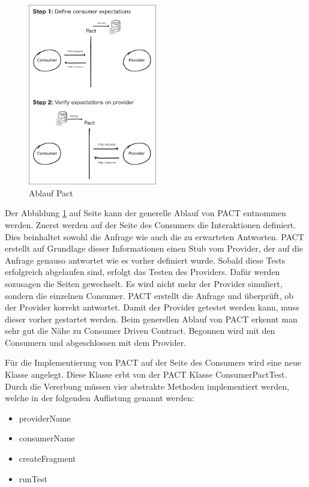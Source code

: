 \documentclass{llncs}
\begin{document}
\begin{figure}[htbp]
  \centering
      \includegraphics[width=0.5\textwidth]{./Images/pact}
    \caption{Ablauf Pact}
    \label{fig:Pact}
\end{figure}

Der Abbildung \ref{fig:Pact} auf Seite \pageref{fig:Pact} kann der generelle Ablauf von PACT entnommen werden. Zuerst werden auf der Seite des Consumers die Interaktionen definiert. Dies beinhaltet sowohl die Anfrage wie auch die zu erwarteten Antworten. PACT erstellt auf Grundlage dieser Informationen einen Stub vom Provider, der auf die Anfrage genauso antwortet wie es vorher definiert wurde. Sobald diese Tests erfolgreich abgelaufen sind, erfolgt das Testen des Providers. Dafür werden sozusagen die Seiten gewechselt. Es wird nicht mehr der Provider simuliert, sondern die einzelnen Consumer. PACT erstellt die Anfrage und überprüft, ob der Provider korrekt antwortet. Damit der Provider getestet werden kann, muss dieser vorher gestartet werden. Beim generellen Ablauf von PACT erkennt man sehr gut die Nähe zu Consumer Driven Contract. Begonnen wird mit den Consumern und abgeschlossen mit dem Provider.

Für die Implementierung von PACT auf der Seite des Consumers wird eine neue Klasse angelegt. Diese Klasse erbt von der PACT Klasse ConsumerPactTest. Durch die Vererbung müssen vier abstrakte Methoden implementiert werden, welche in der folgenden Auflistung genannt werden:
\begin{itemize}
\item providerName
\item consumerName
\item createFragment
\item runTest
\end{itemize}
\end{document}
